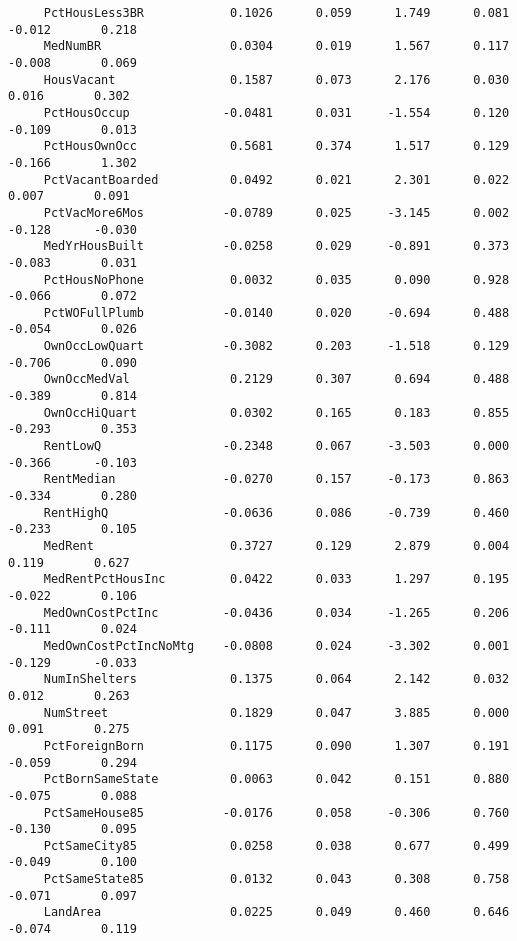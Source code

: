 \documentclass[letterpaper]{article}
\begin{document}
\begin{minipage}{\linewidth}
\begin{Verbatim}
     PctHousLess3BR            0.1026      0.059      1.749      0.081      -0.012       0.218
     MedNumBR                  0.0304      0.019      1.567      0.117      -0.008       0.069
     HousVacant                0.1587      0.073      2.176      0.030       0.016       0.302
     PctHousOccup             -0.0481      0.031     -1.554      0.120      -0.109       0.013
     PctHousOwnOcc             0.5681      0.374      1.517      0.129      -0.166       1.302
     PctVacantBoarded          0.0492      0.021      2.301      0.022       0.007       0.091
     PctVacMore6Mos           -0.0789      0.025     -3.145      0.002      -0.128      -0.030
     MedYrHousBuilt           -0.0258      0.029     -0.891      0.373      -0.083       0.031
     PctHousNoPhone            0.0032      0.035      0.090      0.928      -0.066       0.072
     PctWOFullPlumb           -0.0140      0.020     -0.694      0.488      -0.054       0.026
     OwnOccLowQuart           -0.3082      0.203     -1.518      0.129      -0.706       0.090
     OwnOccMedVal              0.2129      0.307      0.694      0.488      -0.389       0.814
     OwnOccHiQuart             0.0302      0.165      0.183      0.855      -0.293       0.353
     RentLowQ                 -0.2348      0.067     -3.503      0.000      -0.366      -0.103
     RentMedian               -0.0270      0.157     -0.173      0.863      -0.334       0.280
     RentHighQ                -0.0636      0.086     -0.739      0.460      -0.233       0.105
     MedRent                   0.3727      0.129      2.879      0.004       0.119       0.627
     MedRentPctHousInc         0.0422      0.033      1.297      0.195      -0.022       0.106
     MedOwnCostPctInc         -0.0436      0.034     -1.265      0.206      -0.111       0.024
     MedOwnCostPctIncNoMtg    -0.0808      0.024     -3.302      0.001      -0.129      -0.033
     NumInShelters             0.1375      0.064      2.142      0.032       0.012       0.263
     NumStreet                 0.1829      0.047      3.885      0.000       0.091       0.275
     PctForeignBorn            0.1175      0.090      1.307      0.191      -0.059       0.294
     PctBornSameState          0.0063      0.042      0.151      0.880      -0.075       0.088
     PctSameHouse85           -0.0176      0.058     -0.306      0.760      -0.130       0.095
     PctSameCity85             0.0258      0.038      0.677      0.499      -0.049       0.100
     PctSameState85            0.0132      0.043      0.308      0.758      -0.071       0.097
     LandArea                  0.0225      0.049      0.460      0.646      -0.074       0.119

\end{Verbatim}
\end{minipage}
\end{document}
